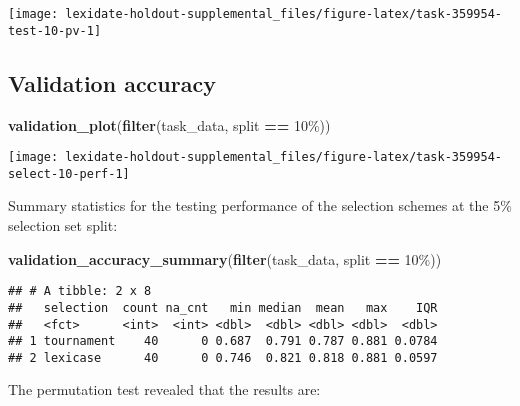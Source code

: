 \documentclass[
]{book}
\newenvironment{Shaded}{\begin{snugshade}}{\end{snugshade}}
\newcommand{\FunctionTok}[1]{\textcolor[rgb]{0.13,0.29,0.53}{\textbf{#1}}}
\newcommand{\NormalTok}[1]{#1}
\newcommand{\SpecialCharTok}[1]{\textcolor[rgb]{0.81,0.36,0.00}{\textbf{#1}}}
\newcommand{\StringTok}[1]{\textcolor[rgb]{0.31,0.60,0.02}{#1}}
\begin{document}
\texttt{[image: lexidate-holdout-supplemental\_files/figure-latex/task-359954-test-10-pv-1]}

\hypertarget{validation-accuracy-6}{%
\subsection{Validation accuracy}\label{validation-accuracy-6}}

\begin{Shaded}
\begin{Highlighting}[]
\FunctionTok{validation\_plot}\NormalTok{(}\FunctionTok{filter}\NormalTok{(task\_data, split }\SpecialCharTok{==} \StringTok{\textquotesingle{}10\%\textquotesingle{}}\NormalTok{))}
\end{Highlighting}
\end{Shaded}

\texttt{[image: lexidate-holdout-supplemental\_files/figure-latex/task-359954-select-10-perf-1]}

Summary statistics for the testing performance of the selection schemes at the 5\% selection set split:

\begin{Shaded}
\begin{Highlighting}[]
\FunctionTok{validation\_accuracy\_summary}\NormalTok{(}\FunctionTok{filter}\NormalTok{(task\_data, split }\SpecialCharTok{==} \StringTok{\textquotesingle{}10\%\textquotesingle{}}\NormalTok{))}
\end{Highlighting}
\end{Shaded}

\begin{verbatim}
## # A tibble: 2 x 8
##   selection  count na_cnt   min median  mean   max    IQR
##   <fct>      <int>  <int> <dbl>  <dbl> <dbl> <dbl>  <dbl>
## 1 tournament    40      0 0.687  0.791 0.787 0.881 0.0784
## 2 lexicase      40      0 0.746  0.821 0.818 0.881 0.0597
\end{verbatim}

The permutation test revealed that the results are:
\end{document}

